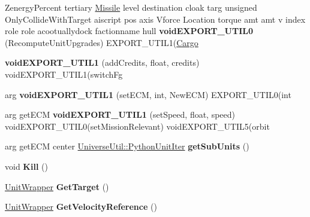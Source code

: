 \begin{DoxyCompactItemize}
\item 
Zenergy\+Percent tertiary \hyperlink{classMissile}{Missile} level destination cloak targ unsigned Only\+Collide\+With\+Target aiscript pos axis Vforce Location torque amt amt v index role role acootuallydock factionname hull {\bfseries void\+E\+X\+P\+O\+R\+T\+\_\+\+U\+T\+I\+L0} (Recompute\+Unit\+Upgrades) E\+X\+P\+O\+R\+T\+\_\+\+U\+T\+I\+L1(\hyperlink{classCargo}{Cargo}\hypertarget{classUnitWrapper_a1ed52c50ddbb1626ef61d4f0a5ed06af}{}\label{classUnitWrapper_a1ed52c50ddbb1626ef61d4f0a5ed06af}

\item 
{\bfseries void\+E\+X\+P\+O\+R\+T\+\_\+\+U\+T\+I\+L1} (add\+Credits, float, credits) void\+E\+X\+P\+O\+R\+T\+\_\+\+U\+T\+I\+L1(switch\+Fg\hypertarget{classUnitWrapper_a73d4d77821b3b0c9e789170d533ecc0a}{}\label{classUnitWrapper_a73d4d77821b3b0c9e789170d533ecc0a}

\item 
arg {\bfseries void\+E\+X\+P\+O\+R\+T\+\_\+\+U\+T\+I\+L1} (set\+E\+CM, int, New\+E\+CM) E\+X\+P\+O\+R\+T\+\_\+\+U\+T\+I\+L0(int\hypertarget{classUnitWrapper_a4e73187a7abe391b9dd9ffabfb931145}{}\label{classUnitWrapper_a4e73187a7abe391b9dd9ffabfb931145}

\item 
arg get\+E\+CM {\bfseries void\+E\+X\+P\+O\+R\+T\+\_\+\+U\+T\+I\+L1} (set\+Speed, float, speed) void\+E\+X\+P\+O\+R\+T\+\_\+\+U\+T\+I\+L0(set\+Mission\+Relevant) void\+E\+X\+P\+O\+R\+T\+\_\+\+U\+T\+I\+L5(orbit\hypertarget{classUnitWrapper_a842769b46f908a2a2d90d7e5db757103}{}\label{classUnitWrapper_a842769b46f908a2a2d90d7e5db757103}

\item 
arg get\+E\+CM center \hyperlink{classUniverseUtil_1_1PythonUnitIter}{Universe\+Util\+::\+Python\+Unit\+Iter} {\bfseries get\+Sub\+Units} ()\hypertarget{classUnitWrapper_a65cb7b1890b654b72e8abe13c49fc596}{}\label{classUnitWrapper_a65cb7b1890b654b72e8abe13c49fc596}

\item 
void {\bfseries Kill} ()\hypertarget{classUnitWrapper_aa957107117ec359a90a5115981ae1312}{}\label{classUnitWrapper_aa957107117ec359a90a5115981ae1312}

\item 
\hyperlink{classUnitWrapper}{Unit\+Wrapper} {\bfseries Get\+Target} ()\hypertarget{classUnitWrapper_a6f21fd39f1e6695ef168562ce9dca114}{}\label{classUnitWrapper_a6f21fd39f1e6695ef168562ce9dca114}

\item 
\hyperlink{classUnitWrapper}{Unit\+Wrapper} {\bfseries Get\+Velocity\+Reference} ()\hypertarget{classUnitWrapper_a092527af9b76a2810cd710a4b5563f49}{}\label{classUnitWrapper_a092527af9b76a2810cd710a4b5563f49}


\end{DoxyCompactItemize}
